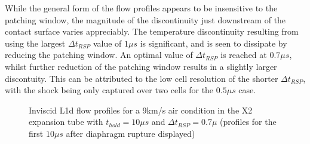 \documentclass[a4paper,10pt]{article}
\begin{document}
While the general form of the flow profiles appears to be insensitive to the patching window, the magnitude of the discontinuity just downstream of the contact surface varies appreciably.  The temperature discontinuity resulting from using the largest $\Delta t_{RSP}$ value of $1 \mu s$ is significant, and is seen to dissipate by reducing the patching window.  An optimal value of $\Delta t_{RSP}$ is reached at $0.7 \mu s$, whilst further reduction of the patching window results in a slightly larger discontuity.  This can be attributed to the low cell resolution of the shorter $\Delta t_{RSP}$, with the shock being only captured over two cells for the $0.5 \mu s$ case.

\par \medskip

\begin{figure}[hb]
\centering
{} \hspace{0cm}
 \caption{Inviscid L1d flow profiles for a 9km/s air condition in the X2 expansion tube with $t_{hold} = 10 \mu s$ and $\Delta t_{RSP} = 0.7 \mu $ (profiles for the first $10 \mu s$ after diaphragm rupture displayed)}
\label{fig:air_iv_profiles} %
\end{figure}
\end{document}
